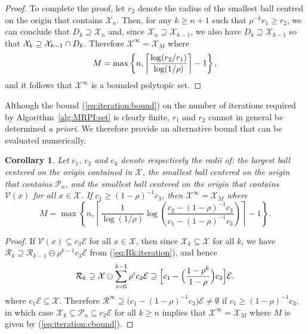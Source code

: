 \documentclass[journal]{IEEEtran}
\newcommand{\todo}[2]{%
  \providetoggle{#1}%
    \iftoggle{#1}{%
    {\color{red}#2}%
    }{#2}
}
\newcounter{thmcount}
\newtheorem{cor}[thmcount]{Corollary}
\theoremstyle{remark}
\theoremstyle{definition}
\begin{document}
\begin{proof}
To complete the proof, let $r_2$ denote the radius of the smallest ball centred on the origin that contains $\mathcal X_n$.
%
Then, for any $k\geq n+1$ such that 
$\rho^{-k} r_1 \geq r_2$, 
we can conclude that $D_k\supseteq \mathcal X_n$ and, since $\mathcal X_n \supseteq \mathcal X_{k-1}$, we also have $D_k\supseteq \mathcal X_{k-1}$ so that 
$\mathcal X_k \todo{Manuel:proof:thm14}{\supseteq} \mathcal{X}_{k-1} \cap D_k$.
%
Therefore $\mathcal X^\infty = \mathcal X_M$ where
\begin{equation}\label{eq:iteration:bound}
M = \max \left\{ n , \left\lceil \frac{\log(r_2/r_1)}{\log(1/\rho)}\right\rceil \todo{Manuel:minus:one}{- 1} \right\},
\end{equation}
and it follows that $\mathcal{X}^\infty$ is a bounded polytopic set.
\end{proof}
%

Although the bound (\ref{eq:iteration:bound}) on the number of iterations required by Algorithm~\ref{alg:MRPI:set} is clearly finite, $r_1$ and $r_2$ cannot in general be determined \textit{a priori}. 
%
We therefore provide an alternative bound that can be evaluated numerically. 

\begin{cor}
Let $c_1$, $c_2$ and $c_3$ denote respectively the radii of: %
the largest ball centered on the origin contained in $\mathcal{X}$, 
%
the smallest ball centered on the origin that contains $\mathcal{P}_n$, and
%
the smallest ball centered on the origin that contains $\mathcal{V}(x)$ for all $x\in\mathcal{X}$.
%
If $c_1\geq (1-\rho)^{-1}c_3$, then $\mathcal X^\infty = \mathcal X_M$ where
\begin{equation}\label{eq:iteration:cbound}
M = \max \left\{ n , \left\lceil \frac{1}{\log(1/\rho)}\log\left(\frac{c_2-(1-\rho)^{-1}c_3}{c_1-(1-\rho)^{-1}c_3}\right)\right\rceil - 1 \right\}.
\end{equation}
\end{cor}
%

\begin{proof}
If $\mathcal{V}(x)\subseteq c_3\mathcal{E}$ for all $x\in\mathcal{X}$, then since $\mathcal{X}_k\subseteq\mathcal{X}$ for all $k$, we have $\mathcal{R}_k \supseteq \mathcal{R}_{k-1}\ominus \rho^{k-1} c_3\mathcal{E}$ from (\ref{eq:Rk:iteration}), and hence
\[
\mathcal{R}_k \supseteq \mathcal{X} \ominus \sum_{i=0}^{k-1} \rho^{i} c_3\mathcal{E} 
\supseteq \Bigl[ c_1 - \Bigl(\frac{1-\rho^k}{1-\rho} \Bigr) c_3\Bigr] \mathcal{E}.
\]
where $c_1 \mathcal{E} \subseteq \mathcal{X}$. 
%
Therefore $\mathcal{R}^\infty \supseteq \bigl( c_1 - (1-\rho)^{-1}c_3\bigr) \mathcal{E} \neq \emptyset$ if $c_1\geq (1-\rho)^{-1}c_3$,
%
in which case $\mathcal{X}_k \subseteq \mathcal{P}_n \subseteq c_2 \mathcal{E}$ for all $k\geq n$ implies that $\mathcal X^\infty = \mathcal X_M$ where $M$ is given by (\ref{eq:iteration:cbound}).
\end{proof}
\end{document}
